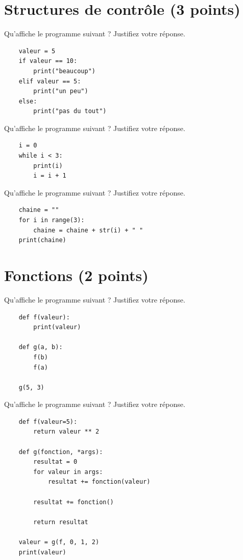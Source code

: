 \documentclass{exam}
\begin{document}
\section{Structures de contrôle \small{(3 points)}}
\begin{questions}
    \question Qu'affiche le programme suivant ? Justifiez votre réponse.
    \begin{verbatim}
    valeur = 5
    if valeur == 10:
        print("beaucoup")
    elif valeur == 5:
        print("un peu")
    else:
        print("pas du tout")
    \end{verbatim}
    \vspace*{1cm}

    \question Qu'affiche le programme suivant ? Justifiez votre réponse.
    \begin{verbatim}
    i = 0
    while i < 3:
        print(i)
        i = i + 1
    \end{verbatim}
    \vspace*{1cm}

    \question Qu'affiche le programme suivant ? Justifiez votre réponse.
    \begin{verbatim}
    chaine = ""
    for i in range(3):
        chaine = chaine + str(i) + " "
    print(chaine)
    \end{verbatim}
    \vspace*{1cm}
\end{questions}

\section{Fonctions \small{(2 points)}}
\begin{questions}
    \question Qu'affiche le programme suivant ? Justifiez votre réponse.
    \begin{verbatim}
    def f(valeur):
        print(valeur)
    
    def g(a, b):
        f(b)
        f(a)
    
    g(5, 3)
    \end{verbatim}
    \vspace*{4cm}

    \question Qu'affiche le programme suivant ? Justifiez votre réponse.
    \begin{verbatim}
    def f(valeur=5):
        return valeur ** 2
    
    def g(fonction, *args):
        resultat = 0
        for valeur in args:
            resultat += fonction(valeur)
    
        resultat += fonction()
    
        return resultat
    
    valeur = g(f, 0, 1, 2)
    print(valeur)
    \end{verbatim}
    \vspace*{1cm}
\end{questions}
\end{document}
